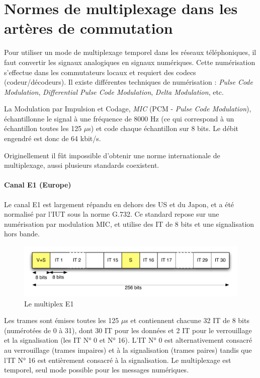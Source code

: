 \documentclass[11pt,english,french]{scrreprt}
\theoremstyle{remark}
\theoremstyle{definition}
\begin{document}
\section{Normes de multiplexage dans les artères de commutation} %

Pour utiliser un mode de multiplexage temporel dans les réseaux téléphoniques, il faut convertir les signaux analogiques en signaux numériques. Cette numérisation s’effectue dans les commutateurs locaux et requiert des codecs (codeur/décodeurs). Il existe différentes techniques de numérisation : \emph{Pulse Code Modulation}, \emph{Differential Pulse Code Modulation}, \emph{Delta Modulation}, etc. 

La Modulation par Impulsion et Codage, \emph{MIC} (PCM - \emph{Pulse Code Modulation}), échantillonne le signal à une fréquence de 8000 Hz (ce qui correspond à un échantillon toutes les 125 $\mu$s) et code chaque échantillon sur 8 bits. Le débit engendré est donc de 64 kbit/s.

Originellement il fût impossible d’obtenir une norme internationale de multiplexage, aussi plusieurs standards coexistent.

\paragraph{Canal E1 (Europe)} %

Le canal E1 est largement répandu en dehors des US et du Japon, et a été normalisé par l’IUT sous la norme G.732. Ce standard repose sur une numérisation par modulation MIC, et utilise des IT de 8 bits et une signalisation hors bande.

\begin{figure}[h!]
	\center
	\includegraphics[scale=.75]{graphes/multiplex-E1}
	\caption{Le multiplex E1}
\end{figure}

Les trames sont émises toutes les 125 $\mu$s et contiennent chacune 32 IT de 8 bits (numérotées de 0 à 31), dont 30 IT pour les données et 2 IT pour le verrouillage et la signalisation (les IT N° 0 et N° 16). L’IT N° 0 est alternativement consacré au verrouillage (trames impaires) et à la signalisation (trames paires) tandis que l’IT N° 16 est entièrement consacré à la signalisation.
Le multiplexage est temporel, seul mode possible pour les messages numériques. 
\end{document}
